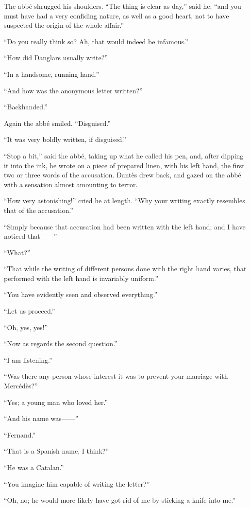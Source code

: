 The abbé shrugged his shoulders. “The thing is clear as day,” said he;
“and you must have had a very confiding nature, as well as a good
heart, not to have suspected the origin of the whole affair.”

“Do you really think so? Ah, that would indeed be infamous.”

“How did Danglars usually write?”

“In a handsome, running hand.”

“And how was the anonymous letter written?”

“Backhanded.”

Again the abbé smiled. “Disguised.”

“It was very boldly written, if disguised.”

“Stop a bit,” said the abbé, taking up what he called his pen, and,
after dipping it into the ink, he wrote on a piece of prepared linen,
with his left hand, the first two or three words of the accusation.
Dantès drew back, and gazed on the abbé with a sensation almost
amounting to terror.

“How very astonishing!” cried he at length. “Why your writing exactly
resembles that of the accusation.”

“Simply because that accusation had been written with the left hand;
and I have noticed that——”

“What?”

“That while the writing of different persons done with the right hand
varies, that performed with the left hand is invariably uniform.”

“You have evidently seen and observed everything.”

“Let us proceed.”

“Oh, yes, yes!”

“Now as regards the second question.”

“I am listening.”

“Was there any person whose interest it was to prevent your marriage
with Mercédès?”

“Yes; a young man who loved her.”

“And his name was——”

“Fernand.”

“That is a Spanish name, I think?”

“He was a Catalan.”

“You imagine him capable of writing the letter?”

“Oh, no; he would more likely have got rid of me by sticking a knife
into me.”

